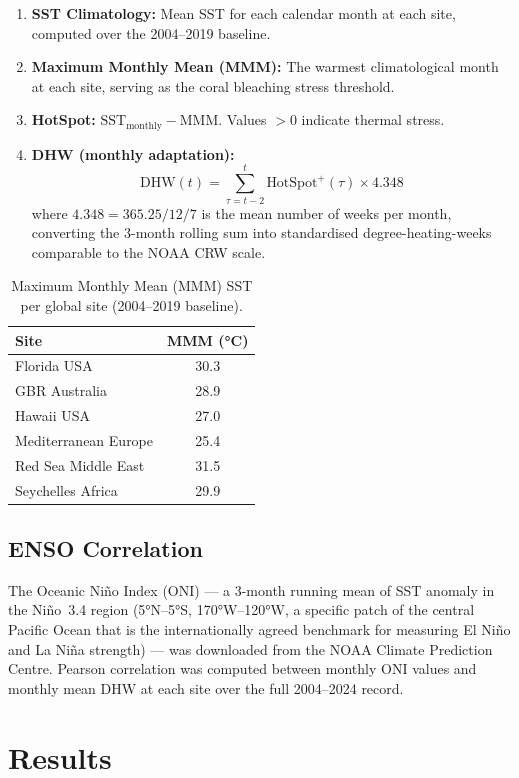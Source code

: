 \documentclass[12pt,a4paper]{report}
\begin{document}
\begin{enumerate}
  \item \textbf{SST Climatology:} Mean SST for each calendar month at each site, computed over the 2004--2019 baseline.
  \item \textbf{Maximum Monthly Mean (MMM):} The warmest climatological month at each site, serving as the coral bleaching stress threshold.
  \item \textbf{HotSpot:} $\text{SST}_{\text{monthly}} - \text{MMM}$. Values $> 0$ indicate thermal stress.
  \item \textbf{DHW (monthly adaptation):}
  \[
    \text{DHW}(t) = \sum_{\tau=t-2}^{t} \text{HotSpot}^{+}(\tau) \times 4.348
  \]
  where $4.348 = 365.25/12/7$ is the mean number of weeks per month, converting the 3-month rolling sum into standardised degree-heating-weeks comparable to the NOAA CRW scale.
\end{enumerate}

\begin{table}[h]
\centering
\caption{Maximum Monthly Mean (MMM) SST per global site (2004--2019 baseline).}
\label{tab:global_mmm}
\begin{tabular}{lc}
\toprule
Site & MMM (°C) \\
\midrule
Florida USA          & 30.3 \\
GBR Australia        & 28.9 \\
Hawaii USA           & 27.0 \\
Mediterranean Europe & 25.4 \\
Red Sea Middle East  & 31.5 \\
Seychelles Africa    & 29.9 \\
\bottomrule
\end{tabular}
\end{table}

\subsection{ENSO Correlation}

The Oceanic Niño Index (ONI) — a 3-month running mean of SST anomaly in the Niño~3.4 region (5°N--5°S, 170°W--120°W, a specific patch of the central Pacific Ocean that is the internationally agreed benchmark for measuring El Niño and La Niña strength) — was downloaded from the NOAA Climate Prediction Centre.
Pearson correlation was computed between monthly ONI values and monthly mean DHW at each site over the full 2004--2024 record.

\section{Results}
\end{document}
